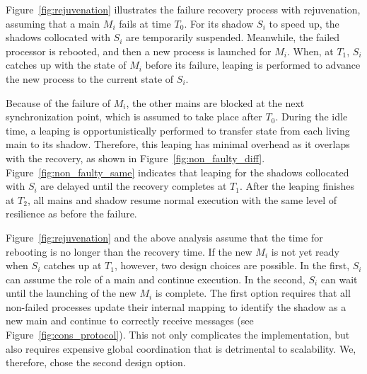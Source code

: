 

Figure~\ref{fig:rejuvenation} illustrates the failure recovery process with rejuvenation, assuming that a main $M_i$ fails at time $T_0$.
For its shadow $S_i$ to speed up, the shadows collocated with $S_i$ are temporarily suspended. %
Meanwhile, the failed processor is rebooted, and then a new process is launched for $M_i$. When, at $T_1$, $S_i$ catches up with the state of $M_i$ before its failure, leaping is performed to advance the new process to the current state of $S_i$. %

Because of the failure of $M_i$, the other mains are blocked at the next synchronization point, which is assumed to take place after $T_0$. During the idle time, a leaping is opportunistically performed to transfer state from each living main to its shadow. Therefore, this leaping has minimal overhead as it overlaps with the recovery, as shown in Figure~\ref{fig:non_faulty_diff}. Figure~\ref{fig:non_faulty_same} indicates that leaping for the shadows collocated with $S_i$ are delayed until the recovery completes at $T_1$. After the leaping finishes at $T_2$, all mains and shadow resume normal execution with the same level of resilience as before the failure.

Figure~\ref{fig:rejuvenation} and the above analysis assume that the time for rebooting is no longer than the recovery time. If the new $M_i$ is not yet ready when $S_i$ catches up at $T_1$, however, two design choices are possible. In the first, $S_i$ can assume the role of a main and continue execution. In the second, $S_i$ can wait until the launching of the new $M_i$ is complete. The first option requires that all non-failed processes update their internal mapping to identify the shadow as a new main and continue to correctly receive messages (see Figure~\ref{fig:cons_protocol}). This not only complicates the implementation, but also requires expensive global coordination that is detrimental to scalability. We, therefore, chose the second design option.


